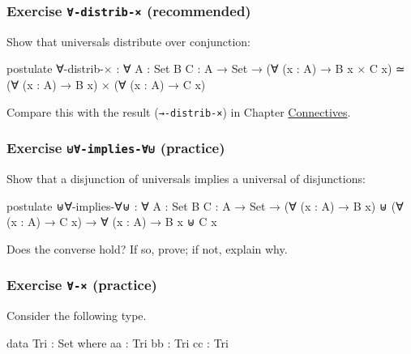 \hypertarget{exercise--distrib--recommended}{%
\subsubsection{\texorpdfstring{Exercise \texttt{∀-distrib-×}
(recommended)}{Exercise ∀-distrib-× (recommended)}}\label{exercise--distrib--recommended}}

Show that universals distribute over conjunction:

\begin{fence}
\begin{code}
postulate
  ∀-distrib-× : ∀ {A : Set} {B C : A → Set} →
    (∀ (x : A) → B x × C x) ≃ (∀ (x : A) → B x) × (∀ (x : A) → C x)
\end{code}
\end{fence}

Compare this with the result (\texttt{→-distrib-×}) in Chapter
\protect\hyperlink{Connectives}{Connectives}.

\hypertarget{exercise--implies--practice}{%
\subsubsection{\texorpdfstring{Exercise \texttt{⊎∀-implies-∀⊎}
(practice)}{Exercise ⊎∀-implies-∀⊎ (practice)}}\label{exercise--implies--practice}}

Show that a disjunction of universals implies a universal of
disjunctions:

\begin{fence}
\begin{code}
postulate
  ⊎∀-implies-∀⊎ : ∀ {A : Set} {B C : A → Set} →
    (∀ (x : A) → B x) ⊎ (∀ (x : A) → C x)  →  ∀ (x : A) → B x ⊎ C x
\end{code}
\end{fence}

Does the converse hold? If so, prove; if not, explain why.

\hypertarget{exercise---practice}{%
\subsubsection{\texorpdfstring{Exercise \texttt{∀-×}
(practice)}{Exercise ∀-× (practice)}}\label{exercise---practice}}

Consider the following type.

\begin{fence}
\begin{code}
data Tri : Set where
  aa : Tri
  bb : Tri
  cc : Tri
\end{code}
\end{fence}

